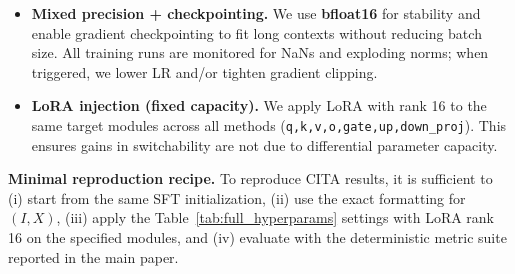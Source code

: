 \begin{itemize}[leftmargin=*,itemsep=2.5pt]
    \item \textbf{Mixed precision + checkpointing.}
    We use \textbf{bfloat16} for stability and enable gradient checkpointing to fit long contexts without reducing batch size.
    All training runs are monitored for NaNs and exploding norms; when triggered, we lower LR and/or tighten gradient clipping.

    \item \textbf{LoRA injection (fixed capacity).}
    We apply LoRA with rank 16 to the same target modules across all methods (\texttt{q,k,v,o,gate,up,down\_proj}).
    This ensures gains in switchability are not due to differential parameter capacity.
\end{itemize}

\vspace{-0.25em}
\noindent
\textbf{Minimal reproduction recipe.}
To reproduce \textsc{CITA} results, it is sufficient to (i) start from the same SFT initialization, (ii) use the exact formatting for $(I,X)$, (iii) apply the Table~\ref{tab:full_hyperparams} settings with LoRA rank 16 on the specified modules, and (iv) evaluate with the deterministic metric suite reported in the main paper.




